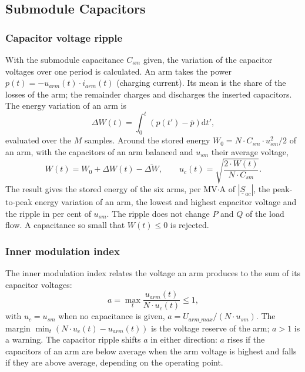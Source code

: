 \subsection{Submodule Capacitors}
\label{sec:converter-capacitors}

\subsubsection{Capacitor voltage ripple}

With the submodule capacitance $C_{sm}$ given, the variation of the capacitor voltages over one period is calculated.
An arm takes the power $p(t) = -u_{arm}(t) \cdot i_{arm}(t)$ (charging current). Its mean is the share of the
losses of the arm; the remainder charges and discharges the inserted capacitors. The energy variation of an arm is
\begin{equation}
  \Delta W(t) = \int_0^t \left( p(t') - \overline{p} \right) \mathrm{d}t' ,
\end{equation}
evaluated over the $M$ samples. Around the stored energy $W_0 = N \cdot C_{sm} \cdot u_{sm}^2 / 2$ of an arm,
with the capacitors of an arm balanced and $u_{sm}$ their average voltage,
\begin{equation}
  W(t) = W_0 + \Delta W(t) - \overline{\Delta W} , \qquad
  u_c(t) = \sqrt{\frac{2 \cdot W(t)}{N \cdot C_{sm}}} .
\end{equation}
The result gives the stored energy of the six arms, per MV$\cdot$A of $|\underline{S}_{ac}|$, the peak-to-peak
energy variation of an arm, the lowest and highest capacitor voltage and the ripple in per cent of $u_{sm}$. The
ripple does not change $P$ and $Q$ of the load flow. A capacitance so small that $W(t) \le 0$ is rejected.

\subsubsection{Inner modulation index}

The inner modulation index relates the voltage an arm produces to the sum of its capacitor voltages:
\begin{equation}
  a = \max_t \frac{u_{arm}(t)}{N \cdot u_c(t)} \le 1 ,
\end{equation}
with $u_c = u_{sm}$ when no capacitance is given, $a = U_{arm\_max} / (N \cdot u_{sm})$. The margin
$\min_t \left( N \cdot u_c(t) - u_{arm}(t) \right)$ is the voltage reserve of the arm; $a > 1$ is a warning. The
capacitor ripple shifts $a$ in either direction: $a$ rises if the capacitors of an arm are below average when the
arm voltage is highest and falls if they are above average, depending on the operating point.
